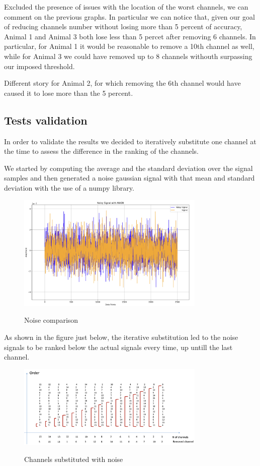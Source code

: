 \documentclass{Configuration_Files/PoliMi3i_thesis}
\begin{document}
Excluded the presence of issues with the location of the worst channels, we can comment on the previous graphs.
In particular we can notice that, given our goal of reducing channels number without losing more than 5 percent of accuracy, Animal 1 and Animal 3 both lose less than 5 percet after removing 6 channels.
In particular, for Animal 1 it would be reasonable to remove a 10th channel as well, while for Animal 3 we could have removed up to 8 channels withouth surpassing our imposed threshold.

Different story for Animal 2, for which removing the 6th channel would have caused it to lose more than the 5 percent.

\subsection*{Tests validation}

In order to validate the results we decided to iteratively substitute one channel at the time to assess the difference in the ranking of the channels.

We started by computing the average and the standard deviation over the signal samples and then generated a noise gaussian signal with that mean and standard deviation with the use of a numpy library.

\begin{figure}[H]
    \centering
    \includegraphics[width=0.8\textwidth]{Results Matteo/Screenshot 2024-08-19 at 08.02.37.png}
    \label{results_1}
    \caption{Noise comparison}
\end{figure}

As shown in the figure just below, the iterative substitution led to the noise signals to be ranked below the actual signals every time, up untill the last channel.

\begin{figure}[H]
    \centering
    \includegraphics[width=0.8\textwidth]{Results Matteo/Screenshot 2024-08-19 at 08.09.29.png}
    \label{results_2}
    \caption{Channels substituted with noise}
\end{figure}
\end{document}
